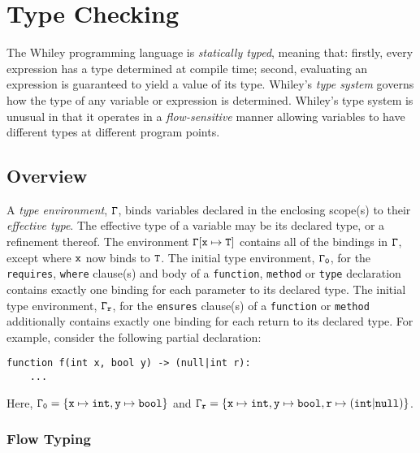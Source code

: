 \newcommand{\tenv}{\Gamma}
\newcommand{\ftype}[3]{#1\vdash #2\dashv #3}

\chapter{Type Checking}
The Whiley programming language is {\em statically typed}, meaning
that: firstly, every expression has a type determined at compile time;
second, evaluating an expression is guaranteed to yield a value of its
type.  Whiley's {\em type system} governs how the type of any variable
or expression is determined.  Whiley's type system is unusual in that
it operates in a {\em flow-sensitive} manner allowing variables to
have different types at different program points.

\section{Overview}

A {\em type environment}, ${\tt\tenv}$, binds variables declared in
the enclosing scope(s) to their {\em effective type}.  The effective
type of a variable may be its declared type, or a refinement thereof.
The environment ${\tt\tenv[x\mapsto T]}$ contains all of the bindings
in ${\tt\tenv}$, except where ${\tt x}$ now binds to ${\tt T}$.  The
initial type environment, ${\tt\tenv_0}$, for the
\lstinline{requires}, \lstinline{where} clause(s) and body of a
\lstinline{function}, \lstinline{method} or \lstinline{type}
declaration contains exactly one binding for each parameter to its
declared type.  The initial type environment, ${\tt\tenv_r}$, for the
\lstinline{ensures} clause(s) of a \lstinline{function} or
\lstinline{method} additionally contains exactly one binding for each
return to its declared type.  For example, consider the following
partial declaration:
\begin{lstlisting}
function f(int x, bool y) -> (null|int r):
    ...
\end{lstlisting}
Here, ${\tt\tenv_0=\{x\mapsto int, y\mapsto bool\}}$ and
${\tt\tenv_r=\{x\mapsto int, y\mapsto bool, r\mapsto(int|null)\}}$.

\subsection{Flow Typing}

